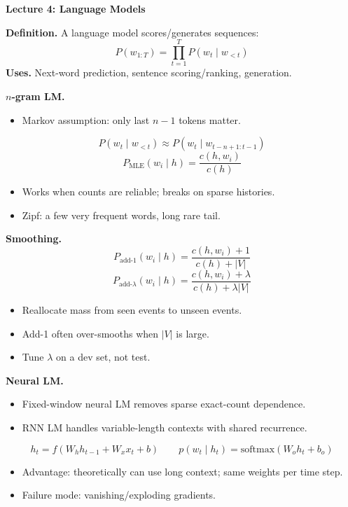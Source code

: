 \documentclass[letterpaper,landscape]{article}
\newcommand{\secbar}[1]{\vspace{1pt}\colorbox{black!12}{\parbox{\linewidth}{\textbf{#1}}}\vspace{1pt}}
\newcommand{\mini}[1]{\textbf{#1}}
\newcommand{\eqline}[1]{\[
\displaystyle #1
\]}
\begin{document}
\begin{minipage}[t]{0.325\textwidth}\vspace{0pt}
\secbar{Lecture 4: Language Models}
\mini{Definition.} A language model scores/generates sequences:
\eqline{P(w_{1:T})=\prod_{t=1}^{T}P(w_t\mid w_{<t})}
\mini{Uses.} Next-word prediction, sentence scoring/ranking, generation.

\mini{$n$-gram LM.}
\begin{itemize}
\item Markov assumption: only last $n-1$ tokens matter.
\end{itemize}
\eqline{P(w_t\mid w_{<t})\approx P(w_t\mid w_{t-n+1:t-1})}
\eqline{P_{\text{MLE}}(w_i\mid h)=\frac{c(h,w_i)}{c(h)}}
\begin{itemize}
\item Works when counts are reliable; breaks on sparse histories.
\item Zipf: a few very frequent words, long rare tail.
\end{itemize}

\mini{Smoothing.}
\eqline{P_{\text{add-1}}(w_i\mid h)=\frac{c(h,w_i)+1}{c(h)+|V|}}
\eqline{P_{\text{add-}\lambda}(w_i\mid h)=\frac{c(h,w_i)+\lambda}{c(h)+\lambda|V|}}
\begin{itemize}
\item Reallocate mass from seen events to unseen events.
\item Add-1 often over-smooths when $|V|$ is large.
\item Tune $\lambda$ on a dev set, not test.
\end{itemize}

\mini{Neural LM.}
\begin{itemize}
\item Fixed-window neural LM removes sparse exact-count dependence.
\item RNN LM handles variable-length contexts with shared recurrence.
\end{itemize}
\eqline{h_t=f(W_h h_{t-1}+W_x x_t+b)\qquad p(w_t\mid h_t)=\mathrm{softmax}(W_o h_t+b_o)}
\begin{itemize}
\item Advantage: theoretically can use long context; same weights per time step.
\item Failure mode: vanishing/exploding gradients.
\end{itemize}


\end{minipage}
\end{document}
